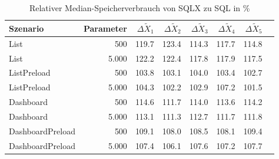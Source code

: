 
\begin{table}[ht]
\setlength{\extrarowheight}{-1pt}
\centering
\caption{Relativer Median-Speicherverbrauch von SQLX zu SQL in \%}
\begin{tabular}{lrrrrrrr}
\toprule
Szenario & Parameter & ${\Delta \tilde{X}_1}$ & ${\Delta \tilde{X}_2}$ & ${\Delta \tilde{X}_3}$ & ${\Delta \tilde{X}_4}$ & ${\Delta \tilde{X}_5}$ \\
\midrule
	List & 500 & \cellcolor{red!10}  119.7 & \cellcolor{red!12}  123.4 & \cellcolor{red!7}  114.3 & \cellcolor{red!9}  117.7 & \cellcolor{red!7}  114.8 \\
	List & 5.000 & \cellcolor{red!11}  122.2 & \cellcolor{red!11}  122.4 & \cellcolor{red!9}  117.8 & \cellcolor{red!9}  117.9 & \cellcolor{red!9}  117.5 \\
	ListPreload & 500 & \cellcolor{red!2}  103.8 & \cellcolor{red!2}  103.1 & \cellcolor{red!2}  104.0 & \cellcolor{red!2}  103.4 & \cellcolor{red!1}  102.7 \\
	ListPreload & 5.000 & \cellcolor{red!2}  104.3 & \cellcolor{red!1}  102.2 & \cellcolor{red!1}  102.9 & \cellcolor{red!4}  107.2 & \cellcolor{red!1}  101.5 \\
	Dashboard & 500 & \cellcolor{red!7}  114.6 & \cellcolor{red!6}  111.7 & \cellcolor{red!7}  114.0 & \cellcolor{red!7}  113.6 & \cellcolor{red!7}  114.2 \\
	Dashboard & 5.000 & \cellcolor{red!7}  113.1 & \cellcolor{red!6}  111.3 & \cellcolor{red!6}  112.7 & \cellcolor{red!6}  111.7 & \cellcolor{red!6}  111.8 \\
	DashboardPreload & 500 & \cellcolor{red!5}  109.1 & \cellcolor{red!4}  108.0 & \cellcolor{red!4}  108.5 & \cellcolor{red!4}  108.1 & \cellcolor{red!5}  109.4 \\
	DashboardPreload & 5.000 & \cellcolor{red!4}  107.4 & \cellcolor{red!3}  106.1 & \cellcolor{red!4}  107.6 & \cellcolor{red!4}  107.2 & \cellcolor{red!4}  107.7 \\
\bottomrule
\end{tabular}
\label{tab:relativer_speicherverbrauch_sqlx}
\end{table}
	
